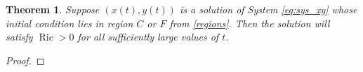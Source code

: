 \documentclass{amsart}
\numberwithin{equation}{section}
\newtheorem{theorem}[equation]{Theorem}
\theoremstyle{plain}
\theoremstyle{definition}
\theoremstyle{remark}
\numberwithin{table}{section}
\DeclareMathOperator{\Ric}{Ric}
\begin{document}
    \begin{theorem}\label{thm:P>0firstcase}
    Suppose $(x(t),y(t))$ is a solution of System \eqref{eq:sys_xy} whose initial condition lies in region $C$ or $F$ from \eqref{regions}.
    Then the solution will satisfy $\Ric>0$ for all sufficiently large values of $t$.
\end{theorem}

\begin{proof}
    
    

\end{proof}
\end{document}
